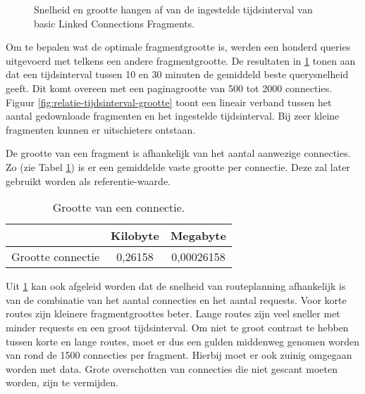 \begin{figure}[!tbp]
  \centering
  \hfill
  \caption{Snelheid en grootte hangen af van de ingestelde tijdsinterval van basic Linked Connections Fragments.}
  \label{fig:fragmentgrootte}
\end{figure}

Om te bepalen wat de optimale fragmentgrootte is, werden een honderd queries uitgevoerd met telkens een andere fragmentgrootte. De resultaten in \ref{fig:fragmentgrootte} tonen aan dat een tijdsinterval tussen 10 en 30 minuten de gemiddeld beste querysnelheid geeft. Dit komt overeen met een paginagrootte van 500 tot 2000 connecties. Figuur \ref{fig:relatie-tijdsinterval-grootte} toont een lineair verband tussen het aantal gedownloade fragmenten en het ingestelde tijdsinterval. Bij zeer kleine fragmenten kunnen er uitschieters ontstaan.

De grootte van een fragment is afhankelijk van het aantal aanwezige connecties. Zo (zie Tabel \ref{table:grootte-connectie}) is er een gemiddelde vaste grootte per connectie. Deze zal later gebruikt worden als referentie-waarde.

 \begin{table}[htbp]
\centering
\begin{tabular}{ | c | c | c | }
  \hline
   & Kilobyte & Megabyte \\ \hline
 Grootte connectie & 0,26158 & 0,00026158 \\
\hline  
\end{tabular}
\caption{Grootte van een connectie.}
\label{table:grootte-connectie}
\end{table}


Uit \ref{fig:fragmentgrootte} kan ook afgeleid worden dat de snelheid van routeplanning afhankelijk is van de combinatie van het aantal connecties en het aantal requests. Voor korte routes zijn kleinere fragmentgroottes beter. Lange routes zijn veel sneller met minder requests en een groot tijdsinterval. Om niet te groot contrast te hebben tussen korte en lange routes, moet er dus een gulden middenweg genomen worden van rond de 1500 connecties per fragment. Hierbij moet er ook zuinig omgegaan worden met data. Grote overschotten van connecties die niet gescant moeten worden, zijn te vermijden.

